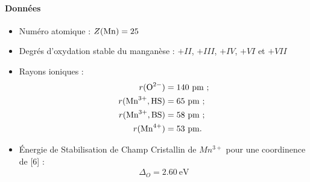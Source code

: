 \paragraph*{Données}
\begin{itemize}
\item Numéro atomique : $Z ( \ce{Mn} ) = 25$
\item Degrés d'oxydation stable du manganèse : $+II$, $+III$, $+IV$, $+VI$ et $+VII$
\item Rayons ioniques : 
\begin{align*}
r( \ce{O^{2-}} ) &= 140 ~ \si{\pico\meter} ~ ; \\
r( \ce{Mn^{3+}}, \text{HS}) &= 65 ~ \si{\pico\meter} ~ ;  \\
r( \ce{Mn^{3+}}, \text{BS}) &= 58 ~ \si{\pico\meter} ~ ;  \\
r( \ce{Mn^{4+}} ) &= 53 ~ \si{\pico\meter}.
\end{align*}
\item \'{E}nergie de Stabilisation de Champ Cristallin de $Mn^{3+}$ pour une coordinence de [6] : 
\begin{align*}
\Delta_O = 2.60 ~ \si{\electronvolt}
\end{align*}
\end{itemize}

